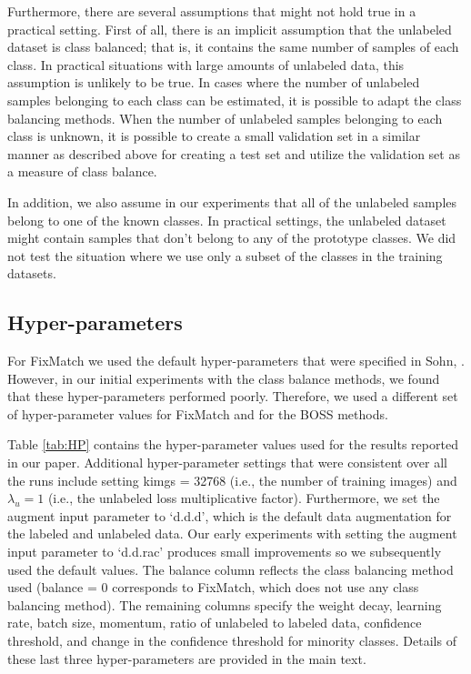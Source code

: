 \documentclass[final]{cvpr}
\newcommand{\HP}{hyper-parameter }
\begin{document}
Furthermore, there are several assumptions that might not hold true in a practical setting.
First of all, there is an implicit assumption that the unlabeled dataset is class balanced; that is, it contains the same number of samples of each class.
In practical situations with large amounts of unlabeled data, this assumption is unlikely to be true.
In cases where the number of unlabeled samples belonging to each class can be estimated, it is possible to adapt the class balancing methods.
When the number of unlabeled samples belonging to each class is unknown, it is possible to create a small validation set in a similar manner as described above for creating a test set and utilize the validation set as a measure of class balance.

In addition, we also assume in our experiments that all of the unlabeled samples belong to one of the known classes.
In practical settings, the unlabeled dataset might contain samples that don't belong to any of the prototype classes.
We did not test the situation where we use only a subset of the classes in the training datasets.


\subsection{Hyper-parameters}
\label{sec:expHP}

For FixMatch we used the default hyper-parameters that were specified in Sohn, \etal \cite{sohn2020fixmatch}.
However, in our initial experiments with the class balance methods, we found that these hyper-parameters performed poorly.
Therefore, we used a different set of \HP values for FixMatch and for the BOSS methods.



Table \ref{tab:HP} contains the hyper-parameter values used for the results reported in our paper.
Additional hyper-parameter settings that were consistent over all the runs include setting kimgs = 32768 (i.e., the number of training images) and $\lambda_u = 1$ (i.e., the unlabeled loss multiplicative factor).
Furthermore, we set the augment input parameter to `d.d.d', which is the default data augmentation for the labeled and unlabeled data.
Our early experiments with setting the augment input parameter to `d.d.rac' produces small improvements so we subsequently used the default values.
The balance column reflects the class balancing method used (balance = 0 corresponds to FixMatch, which does not use any class balancing method).
The remaining columns specify the weight decay, learning rate, batch size, momentum, ratio of unlabeled to labeled data, confidence threshold, and change in the confidence threshold for minority classes.
Details of these last three hyper-parameters are provided in the main text.
\end{document}

